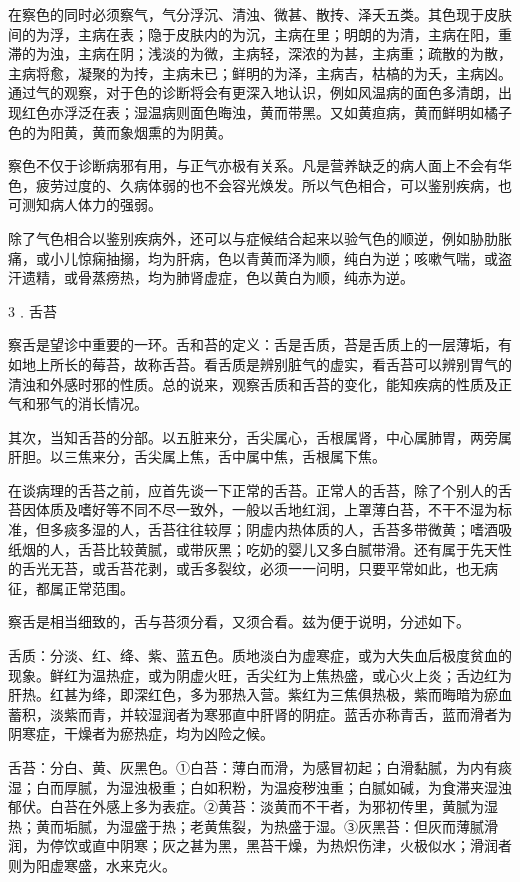 \documentclass[a4paper,12pt,UTF8,twoside]{ctexbook}
\begin{document}
在察色的同时必须察气，气分浮沉、清浊、微甚、散抟、泽夭五类。其色现于皮肤间的为浮，主病在表；隐于皮肤内的为沉，主病在里；明朗的为清，主病在阳，重滞的为浊，主病在阴；浅淡的为微，主病轻，深浓的为甚，主病重；疏散的为散，主病将愈，凝聚的为抟，主病未已；鲜明的为泽，主病吉，枯槁的为夭，主病凶。通过气的观察，对于色的诊断将会有更深入地认识，例如风温病的面色多清朗，出现红色亦浮泛在表；湿温病则面色晦浊，黄而带黑。又如黄疸病，黄而鲜明如橘子色的为阳黄，黄而象烟熏的为阴黄。

察色不仅于诊断病邪有用，与正气亦极有关系。凡是营养缺乏的病人面上不会有华色，疲劳过度的、久病体弱的也不会容光焕发。所以气色相合，可以鉴别疾病，也可测知病人体力的强弱。

除了气色相合以鉴别疾病外，还可以与症候结合起来以验气色的顺逆，例如胁肋胀痛，或小儿惊痫抽搦，均为肝病，色以青黄而泽为顺，纯白为逆；咳嗽气喘，或盗汗遗精，或骨蒸痨热，均为肺肾虚症，色以黄白为顺，纯赤为逆。

3﹒舌苔

察舌是望诊中重要的一环。舌和苔的定义：舌是舌质，苔是舌质上的一层薄垢，有如地上所长的莓苔，故称舌苔。看舌质是辨别脏气的虚实，看舌苔可以辨别胃气的清浊和外感时邪的性质。总的说来，观察舌质和舌苔的变化，能知疾病的性质及正气和邪气的消长情况。

其次，当知舌苔的分部。以五脏来分，舌尖属心，舌根属肾，中心属肺胃，两旁属肝胆。以三焦来分，舌尖属上焦，舌中属中焦，舌根属下焦。

在谈病理的舌苔之前，应首先谈一下正常的舌苔。正常人的舌苔，除了个别人的舌苔因体质及嗜好等不同不尽一致外，一般以舌地红润，上罩薄白苔，不干不湿为标准，但多痰多湿的人，舌苔往往较厚；阴虚内热体质的人，舌苔多带微黄；嗜酒吸纸烟的人，舌苔比较黄腻，或带灰黑；吃奶的婴儿又多白腻带滑。还有属于先天性的舌光无苔，或舌苔花剥，或舌多裂纹，必须一一问明，只要平常如此，也无病征，都属正常范围。

察舌是相当细致的，舌与苔须分看，又须合看。兹为便于说明，分述如下。

舌质：分淡、红、绛、紫、蓝五色。质地淡白为虚寒症，或为大失血后极度贫血的现象。鲜红为温热症，或为阴虚火旺，舌尖红为上焦热盛，或心火上炎；舌边红为肝热。红甚为绛，即深红色，多为邪热入营。紫红为三焦俱热极，紫而晦暗为瘀血蓄积，淡紫而青，并较湿润者为寒邪直中肝肾的阴症。蓝舌亦称青舌，蓝而滑者为阴寒症，干燥者为瘀热症，均为凶险之候。

舌苔：分白、黄、灰黑色。①白苔：薄白而滑，为感冒初起；白滑黏腻，为内有痰湿；白而厚腻，为湿浊极重；白如积粉，为温疫秽浊重；白腻如碱，为食滞夹湿浊郁伏。白苔在外感上多为表症。②黄苔：淡黄而不干者，为邪初传里，黄腻为湿热；黄而垢腻，为湿盛于热；老黄焦裂，为热盛于湿。③灰黑苔：但灰而薄腻滑润，为停饮或直中阴寒；灰之甚为黑，黑苔干燥，为热炽伤津，火极似水；滑润者则为阳虚寒盛，水来克火。
\end{document}
